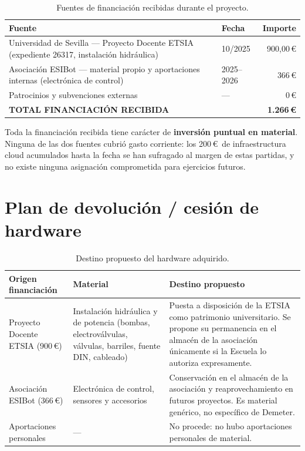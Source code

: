 \begin{table}[H]
    \centering
    \caption{Fuentes de financiaci\'on recibidas durante el proyecto.}
    \label{tab:financiacion_recibida}
    \begin{tabular}{p{7.5cm}lr}
        \toprule
        \textbf{Fuente} & \textbf{Fecha} & \textbf{Importe} \\
        \midrule
        Universidad de Sevilla --- Proyecto Docente ETSIA
        (expediente 26317, instalaci\'on hidr\'aulica)   & 10/2025 & 900,00\,\euro \\
        Asociaci\'on ESIBot --- material propio y
        aportaciones internas (electr\'onica de control) & 2025--2026 & 366\,\euro \\
        Patrocinios y subvenciones externas              & ---     & 0\,\euro \\
        \midrule
        \textbf{TOTAL FINANCIACI\'ON RECIBIDA}           &         & \textbf{1.266\,\euro} \\
        \bottomrule
    \end{tabular}
\end{table}

Toda la financiaci\'on recibida tiene car\'acter de \textbf{inversi\'on
puntual en material}. Ninguna de las dos fuentes cubri\'o gasto
corriente: los 200\,\euro\ de infraestructura cloud acumulados hasta la
fecha se han sufragado al margen de estas partidas, y no existe ninguna
asignaci\'on comprometida para ejercicios futuros.

\section{Plan de devoluci\'on / cesi\'on de hardware}

\begin{table}[H]
    \centering
    \caption{Destino propuesto del hardware adquirido.}
    \label{tab:plan_hardware}
    \begin{tabular}{p{3.4cm}p{4cm}p{5.2cm}}
        \toprule
        \textbf{Origen financiaci\'on} & \textbf{Material} & \textbf{Destino propuesto} \\
        \midrule
        Proyecto Docente ETSIA (900\,\euro) & Instalaci\'on hidr\'aulica y de potencia (bombas, electrov\'alvulas, v\'alvulas, barriles, fuente DIN, cableado) & Puesta a disposici\'on de la ETSIA como patrimonio universitario. Se propone su permanencia en el almac\'en de la asociaci\'on \'unicamente si la Escuela lo autoriza expresamente. \\
        \midrule
        Asociaci\'on ESIBot (366\,\euro) & Electr\'onica de control, sensores y accesorios & Conservaci\'on en el almac\'en de la asociaci\'on y reaprovechamiento en futuros proyectos. Es material gen\'erico, no espec\'ifico de Demeter. \\
        \midrule
        Aportaciones personales & --- & No procede: no hubo aportaciones personales de material. \\
        \bottomrule
    \end{tabular}
\end{table}

